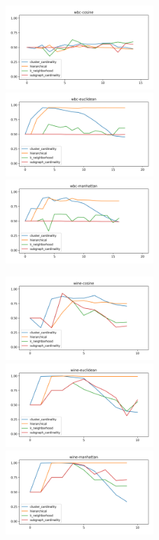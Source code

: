 \begin{figure}[!t]
\includegraphics[width=2.2in]{kdd/static/auc_vs_depth/wbc-cosine.png}
\includegraphics[width=2.2in]{kdd/static/auc_vs_depth/wbc-euclidean.png}
\includegraphics[width=2.2in]{kdd/static/auc_vs_depth/wbc-manhattan.png}

\includegraphics[width=2.2in]{kdd/static/auc_vs_depth/wine-cosine.png}
\includegraphics[width=2.2in]{kdd/static/auc_vs_depth/wine-euclidean.png}
\includegraphics[width=2.2in]{kdd/static/auc_vs_depth/wine-manhattan.png}


\end{figure}
